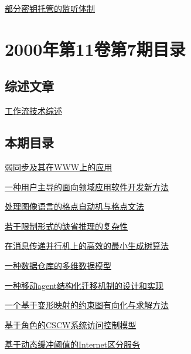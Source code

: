 \documentclass[a4paper]{article}
\begin{document}
\href{http://www.jos.org.cn/ch/reader/download_pdf.aspx?file_no=20000823&year_id=2000&quarter_id=8&falg=1}{部分密钥托管的监听体制}


\section{\textbf{2000年第11卷第7期目录}}
\subsection{综述文章}
\href{http://www.jos.org.cn/ch/reader/download_pdf.aspx?file_no=20000706&year_id=2000&quarter_id=7&falg=1}{工作流技术综述}

\subsection{本期目录}
\href{http://www.jos.org.cn/ch/reader/download_pdf.aspx?file_no=20000701&year_id=2000&quarter_id=7&falg=1}{弱同步及其在WWW上的应用}

\href{http://www.jos.org.cn/ch/reader/download_pdf.aspx?file_no=20000702&year_id=2000&quarter_id=7&falg=1}{一种用户主导的面向领域应用软件开发新方法}

\href{http://www.jos.org.cn/ch/reader/download_pdf.aspx?file_no=20000703&year_id=2000&quarter_id=7&falg=1}{处理图像语言的格点自动机与格点文法}

\href{http://www.jos.org.cn/ch/reader/download_pdf.aspx?file_no=20000704&year_id=2000&quarter_id=7&falg=1}{若干限制形式的缺省推理的复杂性}

\href{http://www.jos.org.cn/ch/reader/download_pdf.aspx?file_no=20000705&year_id=2000&quarter_id=7&falg=1}{在消息传递并行机上的高效的最小生成树算法}

\href{http://www.jos.org.cn/ch/reader/download_pdf.aspx?file_no=20000707&year_id=2000&quarter_id=7&falg=1}{一种数据仓库的多维数据模型}

\href{http://www.jos.org.cn/ch/reader/download_pdf.aspx?file_no=20000708&year_id=2000&quarter_id=7&falg=1}{一种移动agent结构化迁移机制的设计和实现}

\href{http://www.jos.org.cn/ch/reader/download_pdf.aspx?file_no=20000709&year_id=2000&quarter_id=7&falg=1}{一个基于变形映射的约束图有向化与求解方法}

\href{http://www.jos.org.cn/ch/reader/download_pdf.aspx?file_no=20000710&year_id=2000&quarter_id=7&falg=1}{基于角色的CSCW系统访问控制模型}

\href{http://www.jos.org.cn/ch/reader/download_pdf.aspx?file_no=20000711&year_id=2000&quarter_id=7&falg=1}{基于动态缓冲阈值的Internet区分服务}
\end{document}
